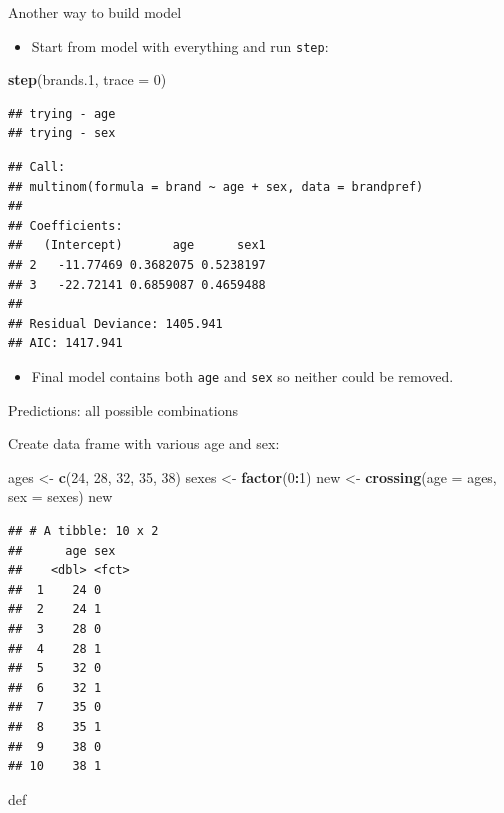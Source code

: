 \documentclass[ignorenonframetext,]{beamer}
\newenvironment{Shaded}{\begin{snugshade}}{\end{snugshade}}
\newcommand{\DataTypeTok}[1]{\textcolor[rgb]{0.13,0.29,0.53}{#1}}
\newcommand{\DecValTok}[1]{\textcolor[rgb]{0.00,0.00,0.81}{#1}}
\newcommand{\FloatTok}[1]{\textcolor[rgb]{0.00,0.00,0.81}{#1}}
\newcommand{\KeywordTok}[1]{\textcolor[rgb]{0.13,0.29,0.53}{\textbf{#1}}}
\newcommand{\NormalTok}[1]{#1}
\newcommand{\OperatorTok}[1]{\textcolor[rgb]{0.81,0.36,0.00}{\textbf{#1}}}
\newcommand{\StringTok}[1]{\textcolor[rgb]{0.31,0.60,0.02}{#1}}
\providecommand{\tightlist}{%
  \setlength{\itemsep}{0pt}\setlength{\parskip}{0pt}}
\begin{document}
\begin{frame}[fragile]{Another way to build model}
\protect\hypertarget{another-way-to-build-model}{}

\begin{itemize}
\tightlist
\item
  Start from model with everything and run \texttt{step}:
\end{itemize}

\begin{Shaded}
\begin{Highlighting}[]
\KeywordTok{step}\NormalTok{(brands}\FloatTok{.1}\NormalTok{, }\DataTypeTok{trace =} \DecValTok{0}\NormalTok{)}
\end{Highlighting}
\end{Shaded}

\begin{verbatim}
## trying - age 
## trying - sex
\end{verbatim}

\begin{verbatim}
## Call:
## multinom(formula = brand ~ age + sex, data = brandpref)
## 
## Coefficients:
##   (Intercept)       age      sex1
## 2   -11.77469 0.3682075 0.5238197
## 3   -22.72141 0.6859087 0.4659488
## 
## Residual Deviance: 1405.941 
## AIC: 1417.941
\end{verbatim}

\begin{itemize}
\tightlist
\item
  Final model contains both \texttt{age} and \texttt{sex} so neither
  could be removed.
\end{itemize}

\end{frame}

\begin{frame}[fragile]{Predictions: all possible combinations}
\protect\hypertarget{predictions-all-possible-combinations}{}

Create data frame with various age and sex:

\begin{Shaded}
\begin{Highlighting}[]
\NormalTok{ages <-}\StringTok{ }\KeywordTok{c}\NormalTok{(}\DecValTok{24}\NormalTok{, }\DecValTok{28}\NormalTok{, }\DecValTok{32}\NormalTok{, }\DecValTok{35}\NormalTok{, }\DecValTok{38}\NormalTok{)}
\NormalTok{sexes <-}\StringTok{ }\KeywordTok{factor}\NormalTok{(}\DecValTok{0}\OperatorTok{:}\DecValTok{1}\NormalTok{)}
\NormalTok{new <-}\StringTok{ }\KeywordTok{crossing}\NormalTok{(}\DataTypeTok{age =}\NormalTok{ ages, }\DataTypeTok{sex =}\NormalTok{ sexes)}
\NormalTok{new}
\end{Highlighting}
\end{Shaded}

\begin{verbatim}
## # A tibble: 10 x 2
##      age sex  
##    <dbl> <fct>
##  1    24 0    
##  2    24 1    
##  3    28 0    
##  4    28 1    
##  5    32 0    
##  6    32 1    
##  7    35 0    
##  8    35 1    
##  9    38 0    
## 10    38 1
\end{verbatim}

def

\end{frame}
\end{document}
